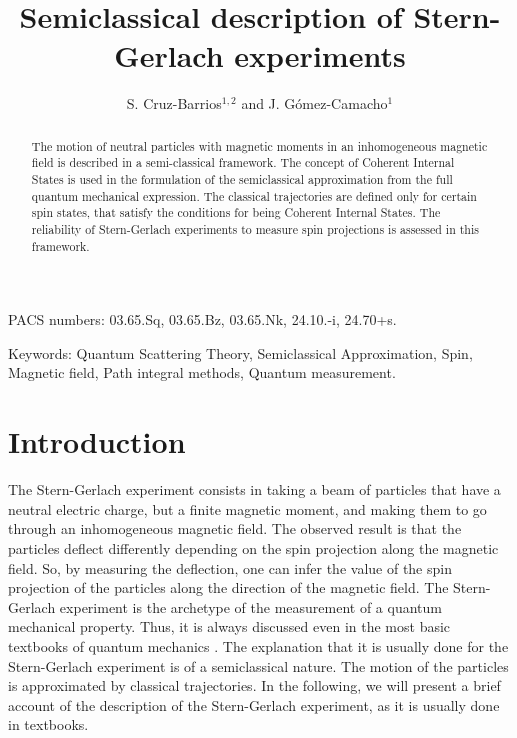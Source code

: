 \documentclass[aps,preprint,prl]{revtex4-2}
\begin{document}
\title{Semiclassical description of Stern-Gerlach experiments}
\author{S. Cruz-Barrios$^{1,2}$ and J. G\'omez-Camacho$^1$}
\address{$^1$ Departamento de F\'\i sica At\'omica, Molecular y Nuclear, 
Aptdo. 1065, 41080 Sevilla, Spain}
\address{$^2$ Departamento de F\'\i sica Aplicada 1, E.U.I.T.A. 
Carretera de Utrera, Km.1 Sevilla, Spain } 
\begin{abstract}
The motion of neutral particles with magnetic moments in an inhomogeneous 
magnetic field is described in a semi-classical framework.
The concept of Coherent Internal States is used in the formulation of the
semiclassical approximation from the full quantum mechanical expression.
The classical trajectories are defined only for certain spin states, that 
satisfy the conditions for being Coherent Internal States.
The reliability  of Stern-Gerlach 
experiments to measure spin projections is assessed
in this framework.
\end{abstract}
\maketitle
\bigskip
\noindent
PACS numbers: 03.65.Sq, 03.65.Bz, 03.65.Nk, 24.10.-i, 24.70+s.

\bigskip
\noindent
Keywords: Quantum Scattering Theory, Semiclassical Approximation, 
Spin, Magnetic field, Path integral methods, Quantum measurement.
\thispagestyle{empty}

\newpage
\section{Introduction}

The Stern-Gerlach experiment consists in taking a beam of particles
that have a neutral electric charge, but a finite magnetic moment, and
making them to go through an inhomogeneous magnetic field. The observed
result is that the particles deflect differently depending on the spin
projection along the magnetic field. So, by measuring the deflection, one can
infer the value of the spin projection of the particles along the direction 
of the magnetic field. The Stern-Gerlach experiment 
is the archetype of the measurement of a 
quantum mechanical property. Thus, it is always discussed even in the most 
basic textbooks of quantum mechanics \cite{eis}.
The explanation  that it is usually done for the Stern-Gerlach
experiment is of a semiclassical nature.  The motion of the particles 
is approximated by classical trajectories. In the following, we will present
a brief account of the description of the Stern-Gerlach experiment, as it is
usually done in textbooks.
\end{document}
